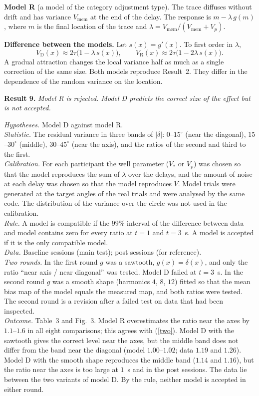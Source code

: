 \documentclass[10pt,a4paper]{article}
\newcommand{\dg}{^{\circ}}
\newcommand{\res}[1]{\textbf{Result #1.}}
\newcommand{\hyp}{\emph{Hypotheses.} }
\newcommand{\stat}{\emph{Statistic.} }
\newcommand{\rul}{\emph{Rule.} }
\newcommand{\dat}{\emph{Data.} }
\newcommand{\outc}{\emph{Outcome.} }
\begin{document}
\textbf{Model R} (a model of the category adjustment type). The trace diffuses without drift and has variance $V_{\mathrm{mem}}$ at the end of the
delay. The response is $m-\lambda\,g(m)$, where $m$ is the final location of the trace and
$\lambda=V_{\mathrm{mem}}/(V_{\mathrm{mem}}+V_p)$.

\textbf{Difference between the models.} Let $s(x)=g'(x)$. To first order in $\lambda$,
\begin{equation}
V_{\mathrm D}(x)\approx2\tau\bigl(1-\lambda\,s(x)\bigr),\qquad
V_{\mathrm R}(x)\approx2\tau\bigl(1-2\lambda\,s(x)\bigr).
\label{two}
\end{equation}
A gradual attraction changes the local variance half as much as a single correction of the same size. Both
models reproduce Result~2. They differ in the dependence of the random variance on the location.

\res{9} \emph{Model R is rejected. Model D predicts the correct size of the effect but is not accepted.}

\hyp Model D against model R.\\
\stat The residual variance in three bands of $|\delta|$: $0$--$15\dg$ (near the diagonal), $15$--$30\dg$
(middle), $30$--$45\dg$ (near the axis), and the ratios of the second and third to the first.\\
\emph{Calibration.} For each participant the well parameter ($V_*$ or $V_p$) was chosen so that the model
reproduces the sum of $\lambda$ over the delays, and the amount of noise at each delay was chosen so that the
model reproduces $V$. Model trials were generated at the target angles of the real trials and were analysed
by the same code. The distribution of the variance over the circle was not used in the calibration.\\
\rul A model is compatible if the $99\%$ interval of the difference between data and model contains zero for
every ratio at $t=1$ and $t=3$~s. A model is accepted if it is the only compatible model.\\
\dat Baseline sessions (main test); post sessions (for reference).\\
\emph{Two rounds.} In the first round $g$ was a sawtooth, $g(x)=\delta(x)$, and only the ratio ``near axis /
near diagonal'' was tested. Model D failed at $t=3$~s. In the second round $g$ was a smooth shape (harmonics
$4$, $8$, $12$) fitted so that the mean bias map of the model equals the measured map, and both ratios were
tested. The second round is a revision after a failed test on data that had been inspected.\\
\outc Table~3 and Fig.~3. Model R overestimates the ratio near the axes by $1.1$--$1.6$ in all eight
comparisons; this agrees with (\ref{two}). Model D with the sawtooth gives the correct level near the axes,
but the middle band does not differ from the band near the diagonal (model $1.00$--$1.02$; data $1.19$ and
$1.26$). Model D with the smooth shape reproduces the middle band ($1.14$ and $1.16$), but the ratio near
the axes is too large at $1$~s and in the post sessions. The data lie between the two variants of model D.
By the rule, neither model is accepted in either round.
\end{document}
